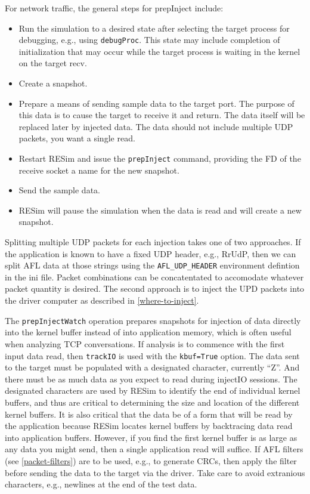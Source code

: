 \documentclass[titlepage]{article}
\begin{document}
For network traffic, the general steps for prepInject include:
\begin{itemize}
\item Run the simulation to a desired state after selecting the target process for debugging, e.g., using {\tt debugProc}.  This state may include
completion of initialization that may occur while the target process is waiting in the kernel on the target recv.
\item Create a snapshot.
\item Prepare a means of sending sample data to the target port.  The purpose of this data is to cause the target to receive it and return.  The
data itself will be replaced later by injected data.  The data should not include multiple UDP packets, you want a single read.
\item Restart RESim and issue the {\tt prepInject} command, providing the FD of the receive socket a name for the new snapshot.
\item Send the sample data.
\item RESim will pause the simulation when the data is read and will create a new snapshot.
\end{itemize}

Splitting multiple UDP packets for each injection takes one of two approaches.  If the application is known
to have a fixed UDP header, e.g., RrUdP, then we can split AFL data at those strings using the {\tt AFL\_UDP\_HEADER} environment
defintion in the ini file.  Packet combinations can be concatentated
to accomodate whatever packet quantity is desired.  The second approach is to inject the UPD packets
into the driver computer as described in  \ref{where-to-inject}.

The {\tt prepInjectWatch} operation prepares snapshots for injection of data directly into the kernel buffer instead of into application memory, which
is often useful when analyzing TCP conversations.
If analysis is to commence with the first input data read, then {\tt trackIO} is used with the {\tt kbuf=True} option.
The data sent to the target must be populated with 
a designated character, currently ``Z''.  And there must be as much data as you expect to read during injectIO sessions.  The designated characters are used by
RESim to identify the end of individual kernel buffers, and thus are critical to determining the size and location of the different kernel buffers.  It is also
critical that the data be of a form that will be read by the application because RESim locates kernel buffers by backtracing data read into application buffers.
However, if you find the first kernel buffer is as large as any data you might send, then a single application read will suffice.
If AFL filters (see \ref{packet-filters}) are to be used, e.g., to generate CRCs, then apply the filter before sending the data to the target via the driver.
Take care to avoid extranious characters, e.g., newlines at the end of the test data.
\end{document}
